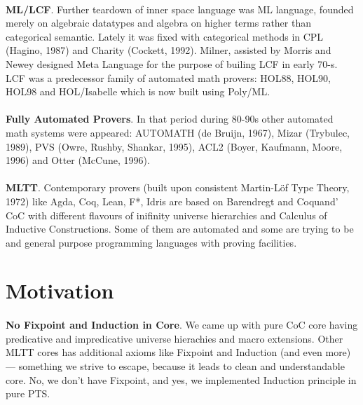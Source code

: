 \documentclass[11pt,oneside]{article}
\begin{document}
\paragraph{}
{\bf ML/LCF}. Further teardown of inner space language was ML language, founded merely on algebraic
datatypes and algebra on higher terms rather than categorical semantic. Lately it
was fixed with categorical methods in CPL (Hagino, 1987) and Charity (Cockett, 1992).
Milner, assisted by Morris and Newey designed Meta Language for the purpose of builing LCF
in early 70-s. LCF was a predecessor family of automated math provers: HOL88,
HOL90, HOL98 and HOL/Isabelle which is now built using Poly/ML.

\paragraph{}
{\bf Fully Automated Provers}. In that period during 80-90s other automated math systems were appeared:
AUTOMATH (de Bruijn, 1967), Mizar (Trybulec, 1989), PVS (Owre, Rushby, Shankar, 1995),
ACL2 (Boyer, Kaufmann, Moore, 1996) and Otter (McCune, 1996).

\paragraph{}
{\bf MLTT}. Contemporary provers (built upon consistent Martin-Löf Type Theory, 1972)
like Agda, Coq, Lean, F*, Idris are based on Barendregt
and Coquand' CoC with different flavours of inifinity universe hierarchies
and Calculus of Inductive Constructions. Some of them are automated and some
are trying to be and general purpose programming languages with proving facilities.

\newpage
\section{Motivation}

\paragraph{}
{\bf No Fixpoint and Induction in Core}. We came up with pure CoC core having
predicative and impredicative universe hierachies and macro extensions. Other MLTT
cores has additional axioms like Fixpoint and Induction (and even more) ---
something we strive to escape, because it leads to clean and understandable core.
No, we don't have Fixpoint, and yes, we implemented Induction principle in pure PTS.
\end{document}
